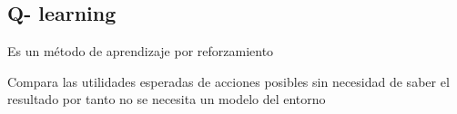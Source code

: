 \subsection{ Q- learning}

Es un método de aprendizaje por reforzamiento

Compara las utilidades esperadas de acciones posibles sin necesidad de saber el resultado por tanto no se necesita un modelo del entorno \cite{peterNorvig}

